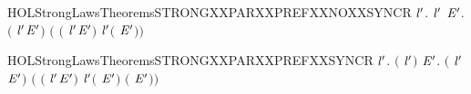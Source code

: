 \begin{SaveVerbatim}{HOLStrongLawsTheoremsSTRONGXXPARXXPREFXXNOXXSYNCR}
\HOLTokenTurnstile{} \HOLSymConst{\HOLTokenForall{}} \ensuremath{\HOLBoundVar{l}\sp{\prime}}.
        \HOLSymConst{\HOLTokenNotEqual{}}  \ensuremath{\HOLBoundVar{l}\sp{\prime}} \HOLSymConst{\HOLTokenImp{}}
       \HOLSymConst{\HOLTokenForall{}} \ensuremath{\HOLBoundVar{E}\sp{\prime}}.
            \ensuremath{(} \HOLSymConst{\ensuremath{\ldotp}} \HOLSymConst{\ensuremath{\mid}}  \ensuremath{\HOLBoundVar{l}\sp{\prime}}\HOLSymConst{\ensuremath{\ldotp}}\ensuremath{\HOLBoundVar{E}\sp{\prime}}\ensuremath{)}
             \ensuremath{(} \HOLSymConst{\ensuremath{\ldotp}}\ensuremath{(} \HOLSymConst{\ensuremath{\mid}}  \ensuremath{\HOLBoundVar{l}\sp{\prime}}\HOLSymConst{\ensuremath{\ldotp}}\ensuremath{\HOLBoundVar{E}\sp{\prime}}\ensuremath{)} \HOLSymConst{\ensuremath{+}}
               \ensuremath{\HOLBoundVar{l}\sp{\prime}}\HOLSymConst{\ensuremath{\ldotp}}\ensuremath{(} \HOLSymConst{\ensuremath{\ldotp}} \HOLSymConst{\ensuremath{\mid}} \ensuremath{\HOLBoundVar{E}\sp{\prime}}\ensuremath{)}\ensuremath{)}
\end{SaveVerbatim}
\newcommand{\HOLStrongLawsTheoremsSTRONGXXPARXXPREFXXNOXXSYNCR}{\UseVerbatim{HOLStrongLawsTheoremsSTRONGXXPARXXPREFXXNOXXSYNCR}}
\begin{SaveVerbatim}{HOLStrongLawsTheoremsSTRONGXXPARXXPREFXXSYNCR}
\HOLTokenTurnstile{} \HOLSymConst{\HOLTokenForall{}} \ensuremath{\HOLBoundVar{l}\sp{\prime}}.
       \ensuremath{(} \HOLSymConst{\ensuremath{=}}  \ensuremath{\HOLBoundVar{l}\sp{\prime}}\ensuremath{)} \HOLSymConst{\HOLTokenImp{}}
       \HOLSymConst{\HOLTokenForall{}} \ensuremath{\HOLBoundVar{E}\sp{\prime}}.
            \ensuremath{(} \HOLSymConst{\ensuremath{\ldotp}} \HOLSymConst{\ensuremath{\mid}}  \ensuremath{\HOLBoundVar{l}\sp{\prime}}\HOLSymConst{\ensuremath{\ldotp}}\ensuremath{\HOLBoundVar{E}\sp{\prime}}\ensuremath{)}
             \ensuremath{(} \HOLSymConst{\ensuremath{\ldotp}}\ensuremath{(} \HOLSymConst{\ensuremath{\mid}}  \ensuremath{\HOLBoundVar{l}\sp{\prime}}\HOLSymConst{\ensuremath{\ldotp}}\ensuremath{\HOLBoundVar{E}\sp{\prime}}\ensuremath{)} \HOLSymConst{\ensuremath{+}}
               \ensuremath{\HOLBoundVar{l}\sp{\prime}}\HOLSymConst{\ensuremath{\ldotp}}\ensuremath{(} \HOLSymConst{\ensuremath{\ldotp}} \HOLSymConst{\ensuremath{\mid}} \ensuremath{\HOLBoundVar{E}\sp{\prime}}\ensuremath{)} \HOLSymConst{\ensuremath{+}} \HOLConst{\ensuremath{\tau}}\HOLSymConst{\ensuremath{\ldotp}}\ensuremath{(} \HOLSymConst{\ensuremath{\mid}} \ensuremath{\HOLBoundVar{E}\sp{\prime}}\ensuremath{)}\ensuremath{)}
\end{SaveVerbatim}
